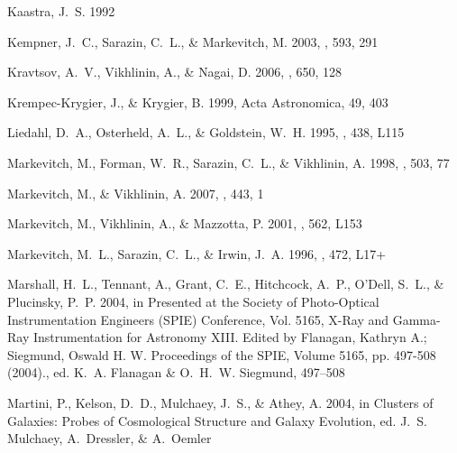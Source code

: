 \documentclass[apj]{emulateapj}
\begin{document}
\begin{thebibliography}{}
{Kaastra}, J.~S. 1992

{Kempner}, J.~C., {Sarazin}, C.~L., \& {Markevitch}, M. 2003, \apj, 593, 291

{Kravtsov}, A.~V., {Vikhlinin}, A., \& {Nagai}, D. 2006, \apj, 650, 128

{Krempec-Krygier}, J., \& {Krygier}, B. 1999, Acta Astronomica, 49, 403

{Liedahl}, D.~A., {Osterheld}, A.~L., \& {Goldstein}, W.~H. 1995, \apjl, 438,
  L115

{Markevitch}, M., {Forman}, W.~R., {Sarazin}, C.~L., \& {Vikhlinin}, A. 1998,
  \apj, 503, 77

{Markevitch}, M., \& {Vikhlinin}, A. 2007, \physrep, 443, 1

{Markevitch}, M., {Vikhlinin}, A., \& {Mazzotta}, P. 2001, \apjl, 562, L153

{Markevitch}, M.~L., {Sarazin}, C.~L., \& {Irwin}, J.~A. 1996, \apjl, 472, L17+

{Marshall}, H.~L., {Tennant}, A., {Grant}, C.~E., {Hitchcock}, A.~P., {O'Dell},
  S.~L., \& {Plucinsky}, P.~P. 2004, in Presented at the Society of
  Photo-Optical Instrumentation Engineers (SPIE) Conference, Vol. 5165, X-Ray
  and Gamma-Ray Instrumentation for Astronomy XIII. Edited by Flanagan, Kathryn
  A.; Siegmund, Oswald H. W. Proceedings of the SPIE, Volume 5165, pp. 497-508
  (2004)., ed. K.~A. {Flanagan} \& O.~H.~W. {Siegmund}, 497--508

{Martini}, P., {Kelson}, D.~D., {Mulchaey}, J.~S., \& {Athey}, A. 2004, in
  Clusters of Galaxies: Probes of Cosmological Structure and Galaxy Evolution,
  ed. J.~S. {Mulchaey}, A.~{Dressler}, \& A.~{Oemler}


\end{thebibliography}
\end{document}
